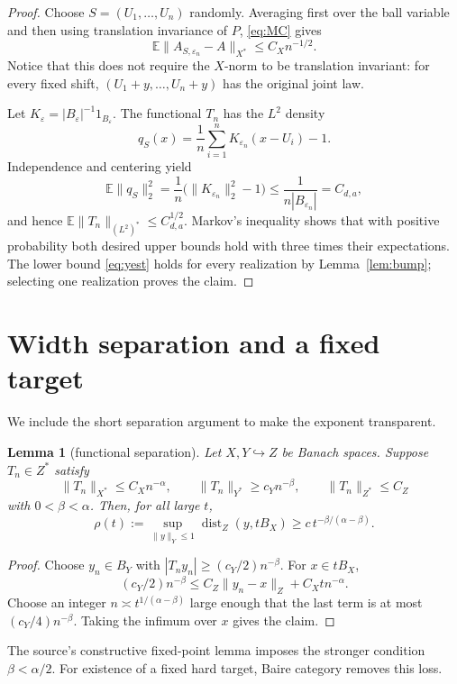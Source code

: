 \documentclass[11pt]{article}
\newtheorem{lemma}[theorem]{Lemma}
\newcommand{\E}{\mathbb E}
\newcommand{\dist}{\operatorname{dist}}
\begin{document}
\begin{proof}
Choose $S=(U_1,\dots,U_n)$ randomly.  Averaging first over the ball variable
and then using translation invariance of $P$, \eqref{eq:MC} gives
\[
 \E\|A_{S,\varepsilon_n}-A\|_{X^*}\le C_Xn^{-1/2}.
\]
Notice that this does not require the $X$-norm to be translation invariant:
for every fixed shift, $(U_1+y,\dots,U_n+y)$ has the original joint law.

Let $K_\varepsilon=|B_\varepsilon|^{-1}1_{B_\varepsilon}$.  The functional
$T_n$ has the $L^2$ density
\[
 q_S(x)=\frac1n\sum_{i=1}^nK_{\varepsilon_n}(x-U_i)-1.
\]
Independence and centering yield
\[
 \E\|q_S\|_2^2
 =\frac1n\big(\|K_{\varepsilon_n}\|_2^2-1\big)
 \le \frac{1}{n|B_{\varepsilon_n}|}=C_{d,a},
\]
and hence $\E\|T_n\|_{(L^2)^*}\le C_{d,a}^{1/2}$.  Markov's inequality
shows that with positive probability both desired upper bounds hold with
three times their expectations.  The lower bound \eqref{eq:yest} holds for
every realization by Lemma~\ref{lem:bump}; selecting one realization proves
the claim.
\end{proof}

\section{Width separation and a fixed target}

We include the short separation argument to make the exponent transparent.

\begin{lemma}[functional separation]\label{lem:separation}
Let $X,Y\hookrightarrow Z$ be Banach spaces.  Suppose $T_n\in Z^*$ satisfy
\[
 \|T_n\|_{X^*}\le C_Xn^{-\alpha},\qquad
 \|T_n\|_{Y^*}\ge c_Yn^{-\beta},\qquad
 \|T_n\|_{Z^*}\le C_Z
\]
with $0<\beta<\alpha$.  Then, for all large $t$,
\[
 \rho(t):=\sup_{\|y\|_Y\le1}\dist_Z(y,tB_X)
 \ge c\,t^{-\beta/(\alpha-\beta)}.
\]
\end{lemma}

\begin{proof}
Choose $y_n\in B_Y$ with $|T_ny_n|\ge(c_Y/2)n^{-\beta}$.  For
$x\in tB_X$,
\[
 (c_Y/2)n^{-\beta}
 \le C_Z\|y_n-x\|_Z+C_Xt n^{-\alpha}.
\]
Choose an integer $n\asymp t^{1/(\alpha-\beta)}$ large enough that the last
term is at most $(c_Y/4)n^{-\beta}$.  Taking the infimum over $x$ gives the
claim.
\end{proof}

The source's constructive fixed-point lemma imposes the stronger condition
$\beta<\alpha/2$.  For existence of a fixed hard target, Baire category
removes this loss.
\end{document}
